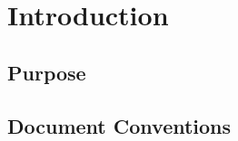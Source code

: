 
\chapter{Introduction}

\section{Purpose}
	\begin{comment}
	$<$Identify the product whose software requirements are specified in this 
	document, including the revision or release number. Describe the scope of the 
	product that is covered by this SRS, particularly if this SRS describes only 
	part of the system or a single subsystem.$>$
	\end{comment}
	
\section{Document Conventions}
	\begin{comment}
		$<$Describe any standards or typographical conventions that were followed when 
		writing this SRS, such as fonts or highlighting that have special significance.  
		For example, state whether priorities  for higher-level requirements are assumed 
		to be inherited by detailed requirements, or whether every requirement statement 
		is to have its own priority.$>$
	\end{comment}
	
